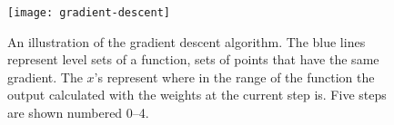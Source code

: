 \begin{figure}[ht]
  \centering
  \texttt{[image: gradient-descent]}
  \caption[An illustration of gradient descent.]{An illustration of the gradient
    descent algorithm. The blue lines represent level sets of a function, sets
    of points that have the same gradient. The $x$'s represent where in the
    range of the function the output calculated with the weights at the
    current step is. Five steps are shown numbered 0--4.}
  \label{fig:grad-desc}
\end{figure}
  